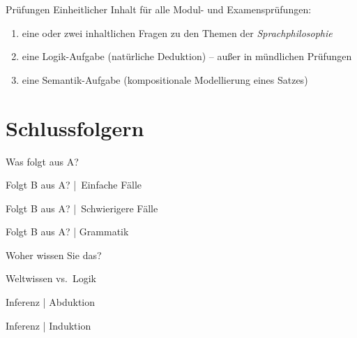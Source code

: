 \begin{frame}
  {Prüfungen}
  \onslide<+->
  \onslide<+->
  Einheitlicher Inhalt für alle Modul- und Examensprüfungen:\\
  \Zeile
  \begin{enumerate}[<+->]
    \item eine oder zwei inhaltlichen Fragen zu den Themen der \textit{Sprachphilosophie}\\
    \item eine Logik-Aufgabe (natürliche Deduktion) -- \alert{außer in mündlichen Prüfungen}
    \item eine Semantik-Aufgabe (kompositionale Modellierung eines Satzes)
  \end{enumerate}
  \Zeile
  \onslide<+->
\end{frame}

\section{Schlussfolgern}

\begin{frame}
  {Was folgt aus A?}
\end{frame}

\begin{frame}
  {Folgt B aus A? | Einfache Fälle}
\end{frame}

\begin{frame}
  {Folgt B aus A? | Schwierigere Fälle}
\end{frame}

\begin{frame}
  {Folgt B aus A? | Grammatik}
\end{frame}

\begin{frame}
  {Woher wissen Sie das?}
\end{frame}

\begin{frame}
  {Weltwissen vs.\ Logik}
\end{frame}

\begin{frame}
  {Inferenz | Abduktion}
\end{frame}

\begin{frame}
  {Inferenz | Induktion}
\end{frame}

